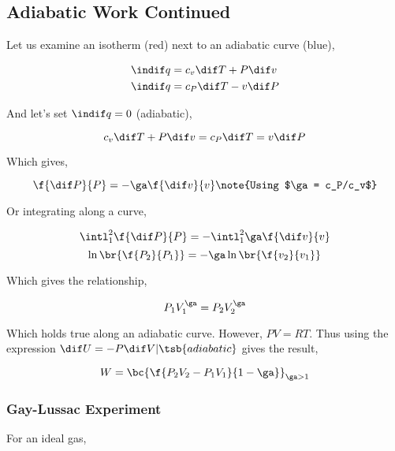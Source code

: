\documentclass{article}
\begin{document}
\subsection{Adiabatic Work Continued}

Let us examine an isotherm (red) next to an adiabatic curve (blue),

\begin{center}
\end{center}

\begin{align*}
    \indif q &= c_v \dif T + P \dif v \\
    \indif q &= c_P \dif T - v \dif P
\end{align*}

And let's set $\indif q = 0$ (adiabatic),

\[ c_v \dif T + P \dif v = c_P \dif T = v \dif P \]

Which gives,

\[ \f{\dif P}{P} = - \ga \f{\dif v}{v} \note{Using $\ga = c_P/c_v$} \]

Or integrating along a curve,

\[ \intl_1^2 \f{\dif P}{P} = - \intl_1^2 \ga \f{\dif v}{v} \]
\[ \ln\br{\f{P_2}{P_1}} = - \ga \ln\br{\f{v_2}{v_1}} \]

Which gives the relationship,

\[ P_1V_1^\ga = P_2V_2^\ga \]

Which holds true along an adiabatic curve. However, $PV = RT$. Thus using the expression $\dif U = - P \dif V |\tsb{adiabatic}$ gives the result,

\[ W = \bc{\f{P_2V_2 - P_1V_1}{1-\ga}}_{\ga > 1} \]

\subsubsection{Gay-Lussac Experiment}
\label{sec:guylussac}

For an ideal gas,
\end{document}
